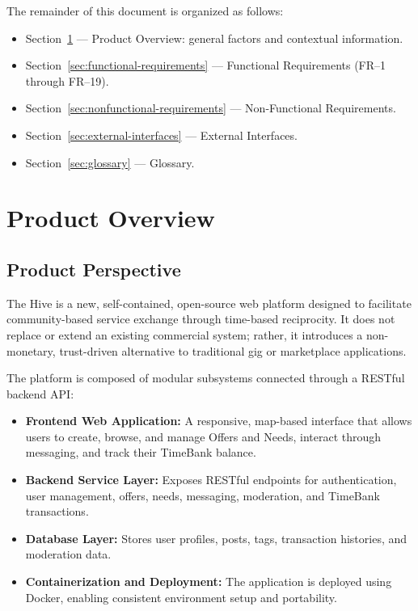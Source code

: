 \documentclass[11pt,a4paper]{report}
\begin{document}
The remainder of this document is organized as follows:
\begin{itemize}
    \item Section~\ref{sec:product-overview} --- Product Overview: general factors and contextual information.
    \item Section~\ref{sec:functional-requirements} --- Functional Requirements (FR--1 through FR--19).
    \item Section~\ref{sec:nonfunctional-requirements} --- Non-Functional Requirements.
    \item Section~\ref{sec:external-interfaces} --- External Interfaces.
    \item Section~\ref{sec:glossary} --- Glossary.
\end{itemize}

\section{Product Overview}
\label{sec:product-overview}

\subsection{Product Perspective}

The Hive is a new, self-contained, open-source web platform designed to facilitate community-based service exchange through time-based reciprocity. It does not replace or extend an existing commercial system; rather, it introduces a non-monetary, trust-driven alternative to traditional gig or marketplace applications.

The platform is composed of modular subsystems connected through a RESTful backend API:

\begin{itemize}
    \item \textbf{Frontend Web Application:} A responsive, map-based interface that allows users to create, browse, and manage Offers and Needs, interact through messaging, and track their TimeBank balance.
    \item \textbf{Backend Service Layer:} Exposes RESTful endpoints for authentication, user management, offers, needs, messaging, moderation, and TimeBank transactions.
    \item \textbf{Database Layer:} Stores user profiles, posts, tags, transaction histories, and moderation data.
    \item \textbf{Containerization and Deployment:} The application is deployed using Docker, enabling consistent environment setup and portability.
\end{itemize}
\end{document}
